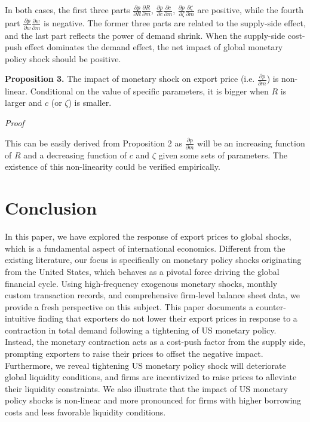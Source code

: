 In both cases, the first three parts $\frac{\partial p}{\partial R}\frac{\partial R}{\partial m}$, $\frac{\partial p}{\partial c}\frac{\partial c}{\partial m}$, $\frac{\partial p}{\partial \zeta}\frac{\partial \zeta}{\partial m}$ are positive, while the fourth part $\frac{\partial p}{\partial w}\frac{\partial w}{\partial m} $ is negative. The former three parts are related to the supply-side effect, and the last part reflects the power of demand shrink. When the supply-side cost-push effect dominates the demand effect, the net impact of global monetary policy shock should be positive. 

\textbf{Proposition 3.} The impact of monetary shock on export price (i.e. $\frac{\partial p}{\partial m}$) is non-linear. Conditional on the value of specific parameters, it is bigger when $R$ is larger and $c$ (or $\zeta$) is smaller.

\textit{Proof}

This can be easily derived from Proposition 2 as $\frac{\partial p}{\partial m}$ will be an increasing function of $R$ and a decreasing function of $c$ and $\zeta$ given some sets of parameters. The existence of this non-linearity could be verified empirically.





\newpage
\section{Conclusion}

In this paper, we have explored the response of export prices to global shocks, which is a fundamental aspect of international economics. Different from the existing literature, our focus is specifically on monetary policy shocks originating from the United States, which behaves as a pivotal force driving the global financial cycle. Using high-frequency exogenous monetary shocks, monthly custom transaction records, and comprehensive firm-level balance sheet data, we provide a fresh perspective on this subject. This paper documents a counter-intuitive finding that exporters do not lower their export prices in response to a contraction in total demand following a tightening of US monetary policy. Instead, the monetary contraction acts as a cost-push factor from the supply side, prompting exporters to raise their prices to offset the negative impact. Furthermore, we reveal tightening US monetary policy shock will deteriorate global liquidity conditions, and firms are incentivized to raise prices to alleviate their liquidity constraints. We also illustrate that the impact of US monetary policy shocks is non-linear and more pronounced for firms with higher borrowing costs and less favorable liquidity conditions.

